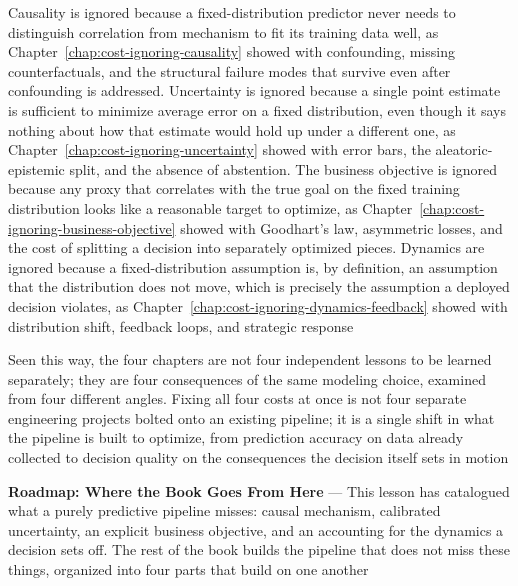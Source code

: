 Causality is ignored because a fixed-distribution predictor never needs to
distinguish correlation from mechanism to fit its training data well, as Chapter~\ref{chap:cost-ignoring-causality}
showed with confounding, missing counterfactuals, and the structural failure modes
that survive even after confounding is addressed. Uncertainty is ignored because
a single point estimate is sufficient to minimize average error on a fixed
distribution, even though it says nothing about how that estimate would hold up under
a different one, as Chapter~\ref{chap:cost-ignoring-uncertainty} showed with
error bars, the aleatoric-epistemic split, and the absence of abstention. The business
objective is ignored because any proxy that correlates with the true goal on the
fixed training distribution looks like a reasonable target to optimize, as
Chapter~\ref{chap:cost-ignoring-business-objective} showed with Goodhart's law, asymmetric
losses, and the cost of splitting a decision into separately optimized pieces. Dynamics
are ignored because a fixed-distribution assumption is, by definition, an assumption
that the distribution does not move, which is precisely the assumption a
deployed decision violates, as Chapter~\ref{chap:cost-ignoring-dynamics-feedback}
showed with distribution shift, feedback loops, and strategic response

Seen this way, the four chapters are not four independent lessons to be learned separately;
they are four consequences of the same modeling choice, examined from four different
angles. Fixing all four costs at once is not four separate engineering projects
bolted onto an existing pipeline; it is a single shift in what the pipeline is built
to optimize, from prediction accuracy on data already collected to decision
quality on the consequences the decision itself sets in motion

\textbf{Roadmap: Where the Book Goes From Here} --- This lesson has catalogued
what a purely predictive pipeline misses: causal mechanism, calibrated
uncertainty, an explicit business objective, and an accounting for the dynamics
a decision sets off. The rest of the book builds the pipeline that does not miss
these things, organized into four parts that build on one another

